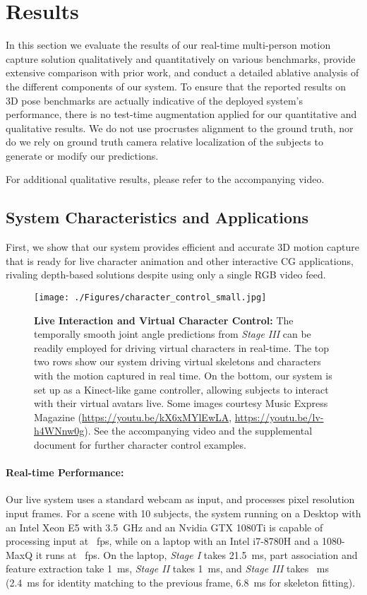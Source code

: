\documentclass[acmtog,authorversion]{acmart}
\begin{document}
\section{Results}
\label{sec:results}

In this section we evaluate the results of our real-time multi-person motion capture solution qualitatively and quantitatively on various benchmarks, provide extensive comparison with prior work, and conduct a detailed ablative analysis of the different components of our system. To ensure that the reported results on 3D pose benchmarks are actually indicative of the deployed system's performance, there is no test-time augmentation applied for our quantitative and qualitative results. We do not use procrustes alignment to the ground truth, nor do we rely on ground truth camera relative localization of the subjects to generate or modify our predictions.


For additional qualitative results, please refer to the accompanying video.


\subsection{System Characteristics and Applications}
First, we show that our system provides efficient and accurate 3D motion capture that is ready for live character animation and other interactive CG applications, rivaling depth-based solutions despite using only a single RGB video feed. 

\begin{figure}[t]
  \texttt{[image: ./Figures/character\_control\_small.jpg]}
  \caption
  {\textbf{Live Interaction and Virtual Character Control:} The temporally smooth joint angle predictions from \textit{Stage III} can be readily employed for driving virtual characters in real-time.
  The top two rows show our system driving virtual skeletons and characters with the motion captured in real time. On the bottom, our system is set up as a Kinect-like game controller, allowing subjects to interact with their virtual avatars live. Some images courtesy Music Express Magazine (\url{https://youtu.be/kX6xMYlEwLA}, \url{https://youtu.be/lv-h4WNnw0g}). See the accompanying video and the supplemental document for further character control examples. 
  }
  \label{fig:character_control}
\end{figure}


\paragraph{Real-time Performance:}
Our live system uses a standard webcam as input, and processes  pixel resolution input frames. For a scene with 10 subjects, the system running on a Desktop with an Intel Xeon E5 with 3.5~GHz and an Nvidia GTX 1080Ti is capable of processing input at ~fps, while on a laptop with an Intel i7-8780H and a 1080-MaxQ it runs at ~fps. 
On the laptop, \textit{Stage I} takes 21.5~ms, part association and feature extraction take 1~ms, \textit{Stage II} takes 1~ms, and \textit{Stage III} takes ~ms (2.4~ms for identity matching to the previous frame, 6.8~ms for skeleton fitting).
\end{document}
